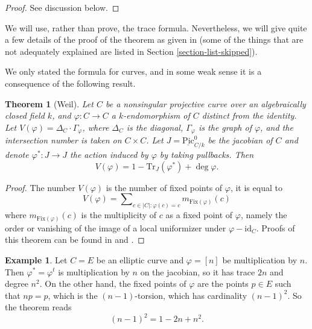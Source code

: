 \documentclass{stacks-project}
\theoremstyle{plain}
\newtheorem{theorem}[subsection]{Theorem}
\theoremstyle{definition}
\newtheorem{example}[subsection]{Example}
\theoremstyle{remark}
\numberwithin{equation}{subsection}
\def\Picardfunctor{\mathrm{Pic}}
\begin{document}
\begin{proof}
See discussion below.
\end{proof}

\noindent
We will use, rather than prove, the trace formula. Nevertheless, we will
give quite a few details of the proof of the theorem as given in
\cite{SGA4.5} (some of the things that are not adequately explained
are listed in Section \ref{section-list-skipped}).

\medskip\noindent
We only stated the formula for curves, and in some weak
sense it is a consequence of the following result.

\begin{theorem}[Weil]
\label{theorem-weil-trace-formula}
Let $C$ be a nonsingular projective curve over an algebraically closed field
$k$, and $\varphi : C \to C$ a $k$-endomorphism of $C$ distinct from the
identity. Let $V(\varphi) = \Delta_C \cdot \Gamma_\varphi$, where $\Delta_C$ is
the diagonal, $\Gamma_\varphi$ is the graph of $\varphi$, and the intersection
number is taken on $C \times C$. Let $J = \underline{\Picardfunctor}^0_{C/k}$
be the jacobian of $C$ and denote $\varphi^* : J \to J$ the action induced by
$\varphi$ by taking pullbacks. Then
$$
V(\varphi) = 1 - \text{Tr}_J(\varphi^*) + \deg \varphi.
$$
\end{theorem}

\begin{proof}
The number $V(\varphi)$ is the number of fixed points of $\varphi$, it is equal
to
$$
V(\varphi) =
\sum\nolimits_{c \in |C| : \varphi(c) = c} m_{\text{Fix}(\varphi)} (c)
$$
where $m_{\text{Fix}(\varphi)} (c)$ is the multiplicity of $c$ as a fixed point
of $\varphi$, namely the order or vanishing of the image of a local uniformizer
under $\varphi - \text{id}_C$. Proofs of this theorem can be found in
\cite{Lang} and \cite{Weil}.
\end{proof}

\begin{example}
\label{example-elliptic-curve}
Let $C = E$ be an elliptic curve and $\varphi = [n]$ be multiplication by $n$.
Then $\varphi^* = \varphi^t$ is multiplication by $n$ on the jacobian, so it
has trace $2n$ and degree $n^2$. On the other hand, the fixed points of
$\varphi$ are the points $p \in E$ such that $n p = p$, which is the
$(n-1)$-torsion, which has cardinality $(n-1)^2$. So the theorem reads
$$
(n-1)^2 = 1 - 2n + n^2.
$$
\end{example}
\end{document}
